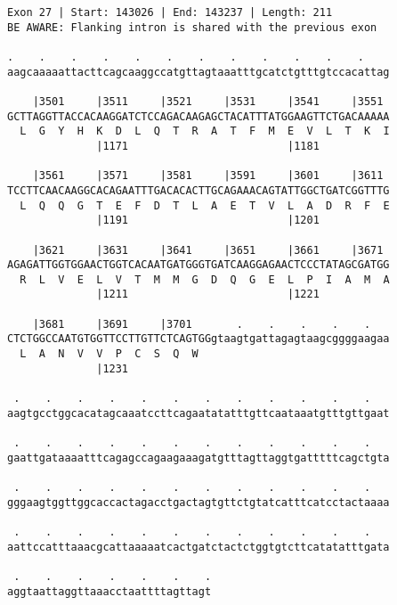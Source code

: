 \documentclass{article}
\begin{document}
\begin{Verbatim}[fontfamily=courier]
Exon 27 | Start: 143026 | End: 143237 | Length: 211
BE AWARE: Flanking intron is shared with the previous exon

.    .    .    .    .    .    .    .    .    .    .    .    
aagcaaaaattacttcagcaaggccatgttagtaaatttgcatctgtttgtccacattag

    |3501     |3511     |3521     |3531     |3541     |3551 
GCTTAGGTTACCACAAGGATCTCCAGACAAGAGCTACATTTATGGAAGTTCTGACAAAAA
  L  G  Y  H  K  D  L  Q  T  R  A  T  F  M  E  V  L  T  K  I
              |1171                         |1181           

    |3561     |3571     |3581     |3591     |3601     |3611 
TCCTTCAACAAGGCACAGAATTTGACACACTTGCAGAAACAGTATTGGCTGATCGGTTTG
  L  Q  Q  G  T  E  F  D  T  L  A  E  T  V  L  A  D  R  F  E
              |1191                         |1201           

    |3621     |3631     |3641     |3651     |3661     |3671 
AGAGATTGGTGGAACTGGTCACAATGATGGGTGATCAAGGAGAACTCCCTATAGCGATGG
  R  L  V  E  L  V  T  M  M  G  D  Q  G  E  L  P  I  A  M  A
              |1211                         |1221           

    |3681     |3691     |3701       .    .    .    .    .   
CTCTGGCCAATGTGGTTCCTTGTTCTCAGTGGgtaagtgattagagtaagcggggaagaa
  L  A  N  V  V  P  C  S  Q  W                              
              |1231                                         

 .    .    .    .    .    .    .    .    .    .    .    .   
aagtgcctggcacatagcaaatccttcagaatatatttgttcaataaatgtttgttgaat

 .    .    .    .    .    .    .    .    .    .    .    .   
gaattgataaaatttcagagccagaagaaagatgtttagttaggtgatttttcagctgta

 .    .    .    .    .    .    .    .    .    .    .    .   
gggaagtggttggcaccactagacctgactagtgttctgtatcatttcatcctactaaaa

 .    .    .    .    .    .    .    .    .    .    .    .   
aattccatttaaacgcattaaaaatcactgatctactctggtgtcttcatatatttgata

 .    .    .    .    .    .    .
aggtaattaggttaaacctaattttagttagt
\end{Verbatim}
\newpage
\end{document}
